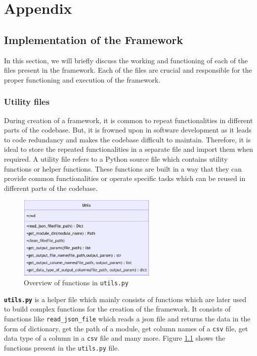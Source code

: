 \appendix
\chapter{Appendix}
\section{Implementation of the Framework}
In this section, we will briefly discuss the working and functioning of each of the files present in the framework. Each of the files are crucial and responsible
for the proper functioning and execution of the framework. 

\subsection{Utility files}
During creation of a framework, it is common to repeat functionalities in different parts of the codebase. But, it is frowned upon in software development as 
it leads to code redundancy and makes the codebase difficult to maintain. Therefore, it is ideal to store the repeated functionalities in a separate file and
import them when required. A utility file refers to a Python source file  which contains utility functions or helper functions. These functions are built in a 
way that they can provide common functionalities or operate specific tasks which can be reused in different parts of the codebase. 
\begin{figure}[!ht] %
  \centering
  \includegraphics[width=0.6\textwidth]{Images/utils.pdf}
  \caption{Overview of functions in \texttt{utils.py}}

  \label{utils_overview}
\end{figure}

\textbf{\texttt{utils.py}} is a helper file which mainly consists of functions which are later used to build complex functions for the creation of the framework.
It consists of functions like \texttt{read\_json\_file} which reads a \acrshort{json} file and returns the data in the form of dictionary, get the path of a module,
get column names of a \texttt{csv} file, get data type of a column in a \texttt{csv} file and many more. Figure \ref{utils_overview} shows the functions present 
in the \texttt{utils.py} file.

